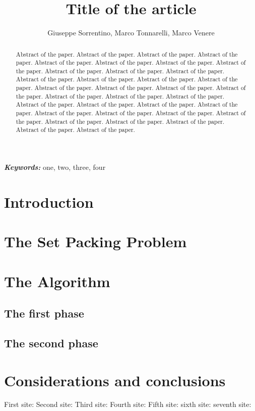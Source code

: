 \documentclass[oneside,a4paper]{article}
\title{Title of the article}
\author{Giuseppe Sorrentino, Marco Tonnarelli, Marco Venere}
\affil{Politecnico di Milano\\
Milan, Italy\\
\href{mailto:first.last@polimi.it}{{ giuseppe.sorrentino@mail.polimi.it\\}{marco.tonnarelli@mail.polimi.it\\} {marco.venere@mail.polimi.it} }}
\date{}
\providecommand{\keywords}[1]{\textbf{\textit{Keywords:}} #1}
\begin{document}
\maketitle
\begin{abstract}
Abstract of the paper. Abstract of the paper. Abstract of the paper. Abstract of the paper. Abstract of the paper. Abstract of the paper. Abstract of the paper. Abstract of the paper. Abstract of the paper. Abstract of the paper. Abstract of the paper. Abstract of the paper. Abstract of the paper. Abstract of the paper. Abstract of the paper. Abstract of the paper. Abstract of the paper. Abstract of the paper. Abstract of the paper. Abstract of the paper. Abstract of the paper. Abstract of the paper. Abstract of the paper. Abstract of the paper. Abstract of the paper. Abstract of the paper. Abstract of the paper. Abstract of the paper. Abstract of the paper. Abstract of the paper. Abstract of the paper. Abstract of the paper. Abstract of the paper. Abstract of the paper. Abstract of the paper.
\end{abstract}

\keywords{one, two, three, four}

\section{Introduction}
\section{The Set Packing Problem}
\section{The Algorithm}
\subsection{The first phase}
\subsection{The second phase}
\section{Considerations and conclusions}


First site: \cite{WebSite1}
Second site: \cite{WebSite2}
Third site: \cite{WebSite3}
Fourth site: \cite{WebSite4}
Fifth site: \cite{WebSite5}
sixth site: \cite{article1}
seventh site: \cite{article2}



\end{document}
